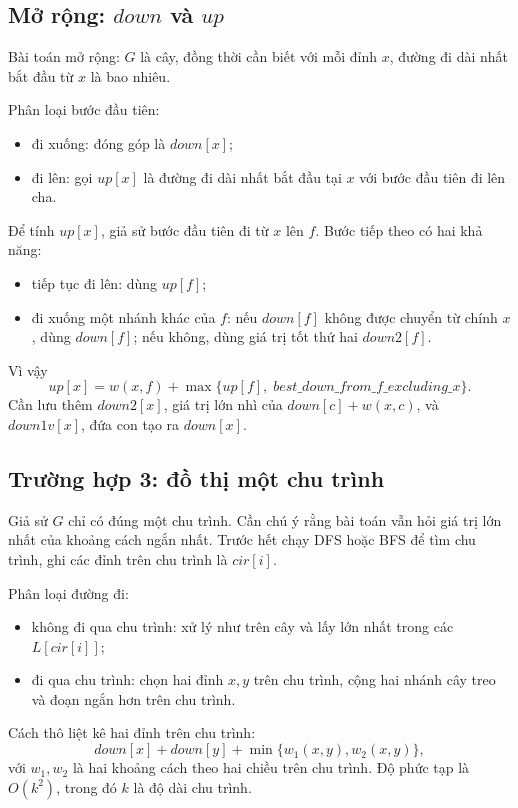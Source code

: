 \documentclass[11pt]{article}
\begin{document}
\subsection{Mở rộng: \texorpdfstring{\(down\)}{down} và \texorpdfstring{\(up\)}{up}}

Bài toán mở rộng: \(G\) là cây, đồng thời cần biết với mỗi đỉnh \(x\), đường đi
dài nhất bắt đầu từ \(x\) là bao nhiêu.

Phân loại bước đầu tiên:
\begin{itemize}
  \item đi xuống: đóng góp là \(down[x]\);
  \item đi lên: gọi \(up[x]\) là đường đi dài nhất bắt đầu tại \(x\) với bước
  đầu tiên đi lên cha.
\end{itemize}

Để tính \(up[x]\), giả sử bước đầu tiên đi từ \(x\) lên \(f\). Bước tiếp theo có
hai khả năng:
\begin{itemize}
  \item tiếp tục đi lên: dùng \(up[f]\);
  \item đi xuống một nhánh khác của \(f\): nếu \(down[f]\) không được chuyển
  từ chính \(x\), dùng \(down[f]\); nếu không, dùng giá trị tốt thứ hai
  \(down2[f]\).
\end{itemize}
Vì vậy
\[
  up[x] = w(x,f) + \max\{up[f],\; best\_down\_from\_f\_excluding\_x\}.
\]
Cần lưu thêm \(down2[x]\), giá trị lớn nhì của \(down[c]+w(x,c)\), và
\(down1v[x]\), đứa con tạo ra \(down[x]\).

\subsection{Trường hợp 3: đồ thị một chu trình}

Giả sử \(G\) chỉ có đúng một chu trình. Cần chú ý rằng bài toán vẫn hỏi giá trị
lớn nhất của khoảng cách ngắn nhất. Trước hết chạy DFS hoặc BFS để tìm chu
trình, ghi các đỉnh trên chu trình là \(cir[i]\).

Phân loại đường đi:
\begin{itemize}
  \item không đi qua chu trình: xử lý như trên cây và lấy lớn nhất trong các
  \(L[cir[i]]\);
  \item đi qua chu trình: chọn hai đỉnh \(x,y\) trên chu trình, cộng hai nhánh
  cây treo và đoạn ngắn hơn trên chu trình.
\end{itemize}

Cách thô liệt kê hai đỉnh trên chu trình:
\[
  down[x] + down[y] + \min\{w_1(x,y), w_2(x,y)\},
\]
với \(w_1,w_2\) là hai khoảng cách theo hai chiều trên chu trình. Độ phức tạp là
\(O(k^2)\), trong đó \(k\) là độ dài chu trình.
\end{document}
